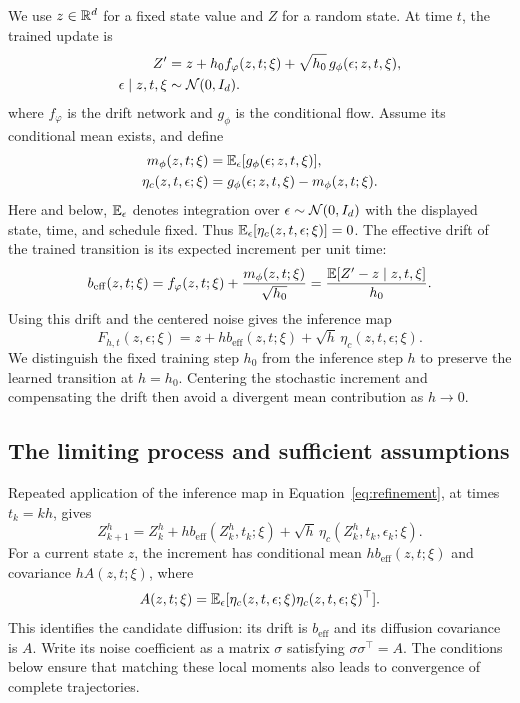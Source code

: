 We use $z\in\mathbb R^d$ for a fixed state value and $Z$ for a random state. At time $t$, the trained update is
\begin{equation}\label{eq:trainingupdate}
 \begin{aligned}
 Z'&=z+h_0 f_\varphi(z,t;\xi)+\sqrt{h_0}\,g_\phi(\epsilon;z,t,\xi),\\
 \epsilon\mid z,t,\xi&\sim\mathcal N(0,I_d).
 \end{aligned}
\end{equation}
where $f_\varphi$ is the drift network and $g_\phi$ is the conditional flow. Assume its conditional mean exists, and define
\begin{align}\label{eq:centerednoise}
 m_\phi(z,t;\xi)&=\mathbb E_\epsilon[g_\phi(\epsilon;z,t,\xi)],\\
 \eta_c(z,t,\epsilon;\xi)&=g_\phi(\epsilon;z,t,\xi)-m_\phi(z,t;\xi).\notag
\end{align}
Here and below, $\mathbb E_\epsilon$ denotes integration over $\epsilon\sim\mathcal N(0,I_d)$ with the displayed state, time, and schedule fixed. Thus $\mathbb E_\epsilon[\eta_c(z,t,\epsilon;\xi)]=0$. The effective drift of the trained transition is its expected increment per unit time:
\begin{equation}\label{eq:effectivedrift}
 b_{\mathrm{eff}}(z,t;\xi)
 =f_\varphi(z,t;\xi)+\frac{m_\phi(z,t;\xi)}{\sqrt{h_0}}
 =\frac{\mathbb E[Z'-z\mid z,t,\xi]}{h_0}.
\end{equation}
Using this drift and the centered noise gives the inference map 
\begin{equation}\label{eq:refinement}
 F_{h,t}(z,\epsilon;\xi)
 =z+h b_{\mathrm{eff}}(z,t;\xi)+\sqrt h\,\eta_c(z,t,\epsilon;\xi).
\end{equation}
We distinguish the fixed training step $h_0$ from the inference step $h$ to preserve the learned transition at $h=h_0$. Centering the stochastic increment and compensating the drift then avoid a divergent mean contribution as $h\to0$.


\subsection{The limiting process and sufficient assumptions}\label{sec:limit-statement}

Repeated application of the inference map in Equation~\eqref{eq:refinement}, at times $t_k=kh$, gives
\begin{equation}\label{eq:centered}
 Z^h_{k+1}=Z^h_k+h b_{\mathrm{eff}}(Z^h_k,t_k;\xi)
                 +\sqrt h\,\eta_c(Z^h_k,t_k,\epsilon_k;\xi).
\end{equation}
For a current state $z$, the increment has conditional mean $h b_{\mathrm{eff}}(z,t;\xi)$ and covariance $hA(z,t;\xi)$, where
\begin{equation}\label{eq:limitcovariance}
 A(z,t;\xi)=\mathbb E_\epsilon[\eta_c(z,t,\epsilon;\xi)\eta_c(z,t,\epsilon;\xi)^\top].
\end{equation}
This identifies the candidate diffusion: its drift is $b_{\mathrm{eff}}$ and its diffusion covariance is $A$. Write its noise coefficient as a matrix $\sigma$ satisfying $\sigma\sigma^\top=A$. The conditions below ensure that matching these local moments also leads to convergence of complete trajectories.

